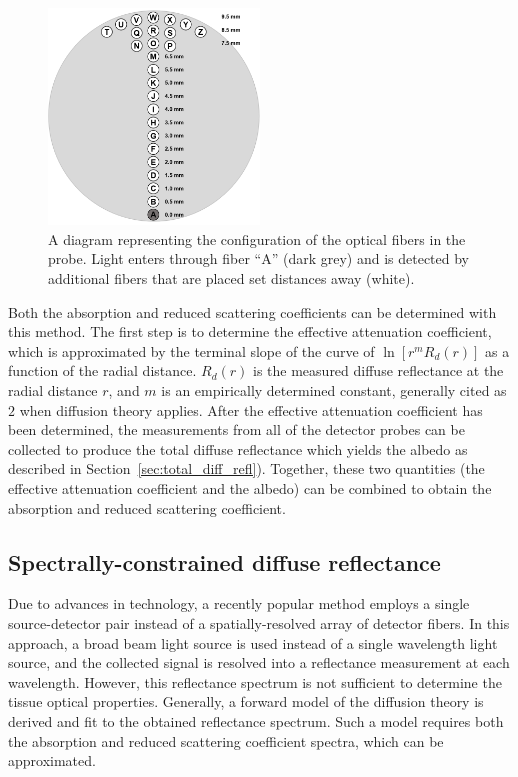 \begin{figure}
	\centering \includegraphics[width=0.5\textwidth]{figures/intro-srdr.png}
	\caption[Probe for spatially-resolved diffuse reflectance]{\label{fig:intro-srdr}A diagram representing the configuration of the optical fibers in the probe. Light enters through fiber “A” (dark grey) and is detected by additional fibers that are placed set distances away (white).}
\end{figure}

Both the absorption and reduced scattering coefficients can be determined with this method. The first step is to determine the effective attenuation coefficient, which is approximated by the terminal slope of the curve of $\ln[r^m R_d(r)] $ as a function of the radial distance. $R_d(r)$ is the measured diffuse reflectance at the radial distance $r$, and $m$ is an empirically determined constant, generally cited as $2$ when diffusion theory applies. After the effective attenuation coefficient has been determined, the measurements from all of the detector probes can be collected to produce the total diffuse reflectance which yields the albedo as described in Section~\ref{sec:total_diff_refl}). Together, these two quantities (the effective attenuation coefficient and the albedo) can be combined to obtain the absorption and reduced scattering coefficient.

\subsection{Spectrally-constrained diffuse reflectance}
\label{spec_diff_refl}
Due to advances in technology, a recently popular method employs a single source-detector pair instead of a spatially-resolved array of detector fibers. In this approach, a broad beam light source is used instead of a single wavelength light source, and the collected signal is resolved into a reflectance measurement at each wavelength. However, this reflectance spectrum is not sufficient to determine the tissue optical properties. Generally, a forward model of the diffusion theory is derived and fit to the obtained reflectance spectrum. Such a model requires both the absorption and reduced scattering coefficient spectra, which can be approximated.

